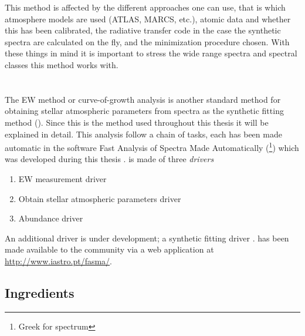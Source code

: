 This method is affected by the different approaches one can use, that is which
atmosphere models are used (ATLAS, MARCS, etc.), atomic data and whether this
has been calibrated, the radiative transfer code in the case the synthetic
spectra are calculated on the fly, and the minimization procedure chosen. With
these things in mind it is important to stress the wide range spectra and
spectral classes this method works with.




\section{\FASMA}
\label{sec:parameters}

The EW method or curve-of-growth analysis is another standard method for
obtaining stellar atmospheric parameters from spectra as the synthetic fitting
method (). Since this is the method used throughout this
thesis it will be explained in detail. This analysis follow a chain of tasks,
each has been made automatic in the software Fast Analysis of Spectra Made
Automatically (\FASMA\footnote{Greek for spectrum}) which was developed during
this thesis \citep{Andreasen2017a}. \FASMA is made of three \emph{drivers}
\begin{enumerate}
  \item EW measurement driver
  \item Obtain stellar atmospheric parameters driver
  \item Abundance driver
\end{enumerate}
An additional driver is under development; a synthetic fitting driver
\citep{Tsantaki2017}. \FASMA has been made available to the community via a web
application at \url{http://www.iastro.pt/fasma/}.


\subsection{Ingredients}


